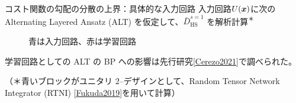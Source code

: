 \documentclass[dvipdfmx,10pt,aspectratio=169]{beamer}
\begin{document}
\newcommand{\bgbs}[1]{\gate[wires=2,style={fill=cyan!50}][1cm][0.1cm]{}\slice{#1}}
\newcommand{\bgb}{\gate[wires=2,style={fill=cyan!50}][1cm][0.1cm]{}}
\newcommand{\agb}{\gate[wires=1,style={fill=red!50}][1cm][0.5cm]{}}
\begin{frame}{コスト関数の勾配の分散の上界：具体的な入力回路}
    入力回路$U(\vb*{x})$に次の Alternating Layered Ansatz (ALT) を仮定して、$\bar{D}_{\mathrm{HS}}^{s=1}$ を解析計算${}^\text{＊}$
    \begin{figure}[H]
        \centering
        \caption{青は入力回路、赤は学習回路}
        \label{fig:alt-tpa-structure}
    \end{figure}
    \vspace*{-5pt}
    学習回路としての ALT の BP への影響は先行研究{\small[\href{http://www.nature.com/articles/s41467-021-21728-w}{Cerezo2021}]}で調べられた。\\
    \begin{scriptsize}
        （＊青いブロックがユニタリ $2$--デザインとして、Random Tensor Network Integrator (RTNI) [\href{http://arxiv.org/abs/1902.08539}{Fukuda2019}]を用いて計算）
    \end{scriptsize}
\end{frame}
\end{document}
